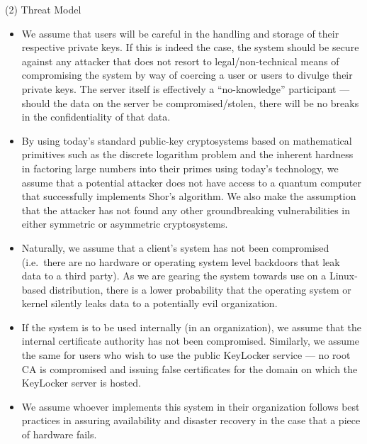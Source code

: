 \documentclass[11pt, letterpaper]{article}
\begin{document}
\noindent(2) Threat Model
\begin{itemize} \itemsep1pt \parskip0pt 
    \item We assume that users will be careful in the handling and storage of their respective private keys. If this is indeed the case, the system should be secure against any attacker that does not resort to legal/non-technical means of compromising the system by way of coercing a user or users to divulge their private keys. The server itself is effectively a “no-knowledge” participant --- should the data on the server be compromised/stolen, there will be no breaks in the confidentiality of that data.
    \item By using today’s standard public-key cryptosystems based on mathematical primitives such as the discrete logarithm problem and the inherent hardness in factoring large numbers into their primes using today’s technology, we assume that a potential attacker does not have access to a quantum computer that successfully implements Shor’s algorithm. We also make the assumption that the attacker has not found any other groundbreaking vulnerabilities in either symmetric or asymmetric cryptosystems.
    \item Naturally, we assume that a client’s system has not been compromised (i.e.\ there are no hardware or operating system level backdoors that leak data to a third party). As we are gearing the system towards use on a Linux-based distribution, there is a lower probability that the operating system or kernel silently leaks data to a potentially evil organization.
    \item If the system is to be used internally (in an organization), we assume that the internal certificate authority has not been compromised. Similarly, we assume the same for users who wish to use the public KeyLocker service --- no root \ac{CA} is compromised and issuing false certificates for the domain on which the KeyLocker server is hosted.
    \item We assume whoever implements this system in their organization follows best practices in assuring availability and disaster recovery in the case that a piece of hardware fails.
\end{itemize}
\end{document}
